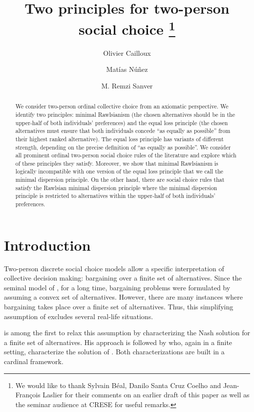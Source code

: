 \documentclass[version=3.21, pagesize, twoside=off, bibliography=totoc, DIV=calc, fontsize=12pt, a4paper]{scrartcl}
\title{Two principles for two-person social choice \thanks{We would like to thank Sylvain Béal, Danilo Santa Cruz Coelho and Jean-François Laslier for their comments on an earlier draft of this paper as well as the seminar audience at CRESE for useful remarks.}}
\author[*]{Olivier Cailloux}
\author[**]{Matías Núñez}
\author[*]{M. Remzi Sanver}
\affil[*]{Université Paris-Dauphine, PSL Research University, CNRS, LAMSADE, 75016 PARIS, FRANCE}
\affil[**]{CREST, CNRS, École Polytechnique, GENES, ENSAE Paris, Institut Polytechnique de Paris, 91120 Palaiseau, France.}
\begin{document}
\maketitle

\begin{abstract}
    We consider two-person ordinal collective choice from an axiomatic perspective. We identify two principles: minimal Rawlsianism (the chosen alternatives should be in the upper-half of both individuals’ preferences) and the equal loss principle (the chosen alternatives must ensure that both individuals concede “as equally as possible” from their highest ranked alternative). The equal loss principle has variants of different strength, depending on the precise definition of “as equally as possible”. We consider all prominent ordinal two-person social choice rules of the literature and explore which of these principles they satisfy. Moreover, we show that minimal Rawlsianism is logically incompatible with one version of the equal loss principle that we call the minimal dispersion principle. On the other hand, there are social choice rules that satisfy the Rawlsian minimal dispersion principle where the minimal dispersion principle is restricted to alternatives within the upper-half of both individuals’ preferences.
\end{abstract}

\section{Introduction}
\label{sec:intro}
Two-person discrete social choice models allow a specific interpretation of collective decision making: bargaining over a finite set of alternatives. Since the seminal model of \citet{Nash1950}, for a long time, bargaining problems were formulated by assuming a convex set of alternatives. However, there are many instances where bargaining takes place over a finite set of alternatives. Thus, this simplifying assumption of \citeauthor{Nash1950} excludes several real-life situations. 

 is among the first to relax this assumption by characterizing the Nash solution for a finite set of alternatives. His approach is followed by \citet{nagahisa2002axiomatization} who, again in a finite setting, characterize the solution of \citet{kalai1975other}. Both characterizations are built in a cardinal framework. 
 
\end{document}
